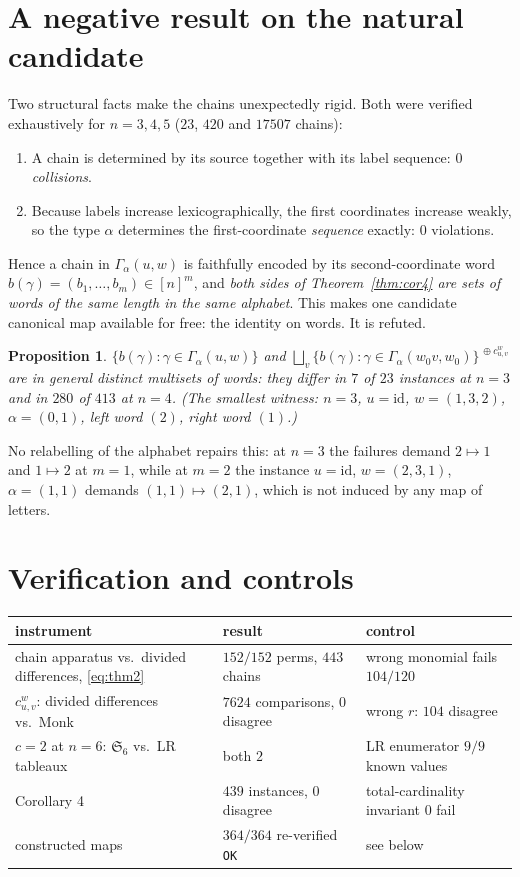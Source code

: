 \documentclass[11pt]{article}
\theoremstyle{plain}
\newtheorem{proposition}[theorem]{Proposition}
\theoremstyle{definition}
\newcommand{\Gam}{\Gamma}
\newcommand{\wo}{w_0}
\begin{document}
\section{A negative result on the natural candidate}

Two structural facts make the chains unexpectedly rigid.  Both were verified
exhaustively for $n=3,4,5$ ($23$, $420$ and $17507$ chains):
\begin{enumerate}
\item A chain is determined by its source together with its label sequence:
  \emph{$0$ collisions}.
\item Because labels increase lexicographically, the first coordinates increase
  weakly, so the type $\alpha$ determines the first-coordinate \emph{sequence}
  exactly: $0$ violations.
\end{enumerate}
Hence a chain in $\Gam_\alpha(u,w)$ is faithfully encoded by its
second-coordinate word $b(\gamma)=(b_1,\dots,b_m)\in[n]^m$, and \emph{both sides
of Theorem~\ref{thm:cor4} are sets of words of the same length in the same
alphabet}.  This makes one candidate canonical map available for free: the
identity on words.  It is refuted.

\begin{proposition}
$\{b(\gamma):\gamma\in\Gam_\alpha(u,w)\}$ and
$\bigsqcup_v\{b(\gamma):\gamma\in\Gam_\alpha(\wo v,\wo)\}^{\,\oplus c^w_{u,v}}$
are in general distinct multisets of words: they differ in $7$ of $23$ instances
at $n=3$ and in $280$ of $413$ at $n=4$.  (The smallest witness: $n=3$,
$u=\mathrm{id}$, $w=(1,3,2)$, $\alpha=(0,1)$, left word $(2)$, right word $(1)$.)
\end{proposition}

No relabelling of the alphabet repairs this: at $n=3$ the failures demand
$2\mapsto1$ and $1\mapsto2$ at $m=1$, while at $m=2$ the instance
$u=\mathrm{id}$, $w=(2,3,1)$, $\alpha=(1,1)$ demands $(1,1)\mapsto(2,1)$, which
is not induced by any map of letters.

\section{Verification and controls}

\begin{center}
\begin{tabular}{lll}
\toprule
instrument & result & control\\
\midrule
chain apparatus vs.\ divided differences, \eqref{eq:thm2}
  & $152/152$ perms, $443$ chains
  & wrong monomial fails $104/120$\\
$c^w_{u,v}$: divided differences vs.\ Monk
  & $7624$ comparisons, $0$ disagree
  & wrong $r$: $104$ disagree\\
$c=2$ at $n=6$: $\mathfrak{S}_6$ vs.\ LR tableaux
  & both $2$
  & LR enumerator $9/9$ known values\\
Corollary 4
  & $439$ instances, $0$ disagree
  & total-cardinality invariant $0$ fail\\
constructed maps
  & $364/364$ re-verified \texttt{OK}
  & see below\\
\bottomrule
\end{tabular}
\end{center}
\end{document}
